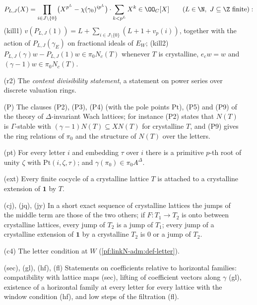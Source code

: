 \begin{definition}
\begin{itemize}
  \[
  P_{L,J}(X)=\prod_{i\in J\setminus\{0\}}\bigl(X^{p^L}-\chi(\gamma_0)^{ip^L}\bigr)\cdot\sum_{k<p^L}X^k\in\OO_C[X]
  \qquad(L\in\N,\ J\subseteq\Z\text{ finite}):
  \]
  (kill1) $v(P_{L,J}(1))=L+\sum_{i\in J\setminus\{0\}}(L+1+v_p(i))$, together with the action of $P_{L,J}(\gamma_E)$ on
  fractional ideals of $E_W$; (kill2) $P_{L,J}(\gamma)w-P_{L,J}(1)w\in\pi_0N_c(T)$ whenever $T$ is crystalline, $e_cw=w$
  and $(\gamma-1)w\in\pi_0N_c(T)$.
\item[(r2)] The \emph{content divisibility statement}, a statement on power series over discrete valuation rings.
\item[(P)] The clauses (P2), (P3), (P4) (with the pole points $\mathrm{Pt}$), (P5) and (P9) of the theory of
  $\Delta$-invariant Wach lattices; for instance (P2) states that $N(T)$ is $\Gamma$-stable with $(\gamma-1)N(T)\subseteq
  XN(T)$ for crystalline $T$, and (P9) gives the ring relations of $\pi_0$ and the structure of $N(T)$ over the letters.
\item[(pt)] For every letter $i$ and embedding $\tau$ over $i$ there is a primitive $p$-th root of unity $\zeta$ with
  $\mathrm{Pt}(i,\zeta,\tau)$; and $\gamma(\pi_0)\in\pi_0A^\Delta$.
\item[(ext)] Every finite cocycle of a crystalline lattice $T$ is attached to a crystalline extension of $\mathbf 1$ by $T$.
\item[(cj), (jq), (jy)] In a short exact sequence of crystalline lattices the jumps of the middle term are those of the
  two others; if $F\colon T_1\to T_2$ is onto between crystalline lattices, every jump of $T_2$ is a jump of $T_1$; every
  jump of a crystalline extension of $\mathbf 1$ by a crystalline $T_2$ is $0$ or a jump of $T_2$.
\item[(c4)] The letter condition at $W$ (\cref{pf:linkN-adm:def-letter}).
\item[(sec), (gl), (hf), (fl)] Statements on coefficients relative to horizontal families: compatibility with lattice
  maps (sec), lifting of coefficient vectors along $\gamma$ (gl), existence of a horizontal family at every letter for
  every lattice with the window condition (hf), and low steps of the filtration (fl).
\end{itemize}
\end{definition}


